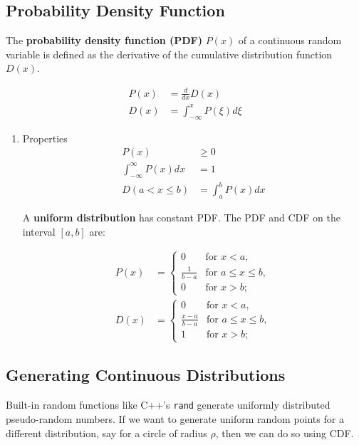 \documentclass[11pt]{article}
\begin{document}
\subsection{Probability Density Function}
\label{sec:org44b1760}
The \textbf{probability density function (PDF)} \(P\left( x \right)\) of a continuous random variable is defined as the derivative of the cumulative distribution function \(D\left( x \right)\).

\begin{align*}
    P\left( x \right) &= \frac{d}{dx}D\left( x \right) \\
    D\left( x \right) &= \int_{-\infty}^{x} P\left( \xi \right) d\xi
\end{align*}

\begin{enumerate}
\item Properties
\label{sec:org2a0aa00}
 \begin{align*}
     P\left( x \right) &\geq 0 \\
     \int_{-\infty}^{\infty} P\left( x \right)dx &= 1 \\
     D\left( a < x \leq b \right) &= \int_{a}^{b} P\left( x \right)dx
\end{align*}

A \textbf{uniform distribution} has constant PDF. The PDF and CDF on the interval \(\left[ a,b \right]\) are:

\begin{align*}
    P\left( x \right) &= \begin{cases}
                             0 &\text{for } x < a, \\
                             \frac{1}{b - a} &\text{for } a \leq x \leq b, \\
                             0 &\text{for } x > b;
                         \end{cases} \\
    D\left( x \right) &= \begin{cases}
                             0 &\text{for } x < a, \\
                             \frac{x - a}{b - a} &\text{for } a \leq x \leq b, \\
                             1 &\text{for } x > b;
                         \end{cases}
\end{align*}
\end{enumerate}

\subsection{Generating Continuous Distributions}
\label{sec:org7cc4bf2}
Built-in random functions like C++'s \texttt{rand} generate uniformly distributed pseudo-random numbers. If we want to generate uniform random points for a different distribution, say for a circle of radius \(\rho\), then we can do so using CDF.
\end{document}
